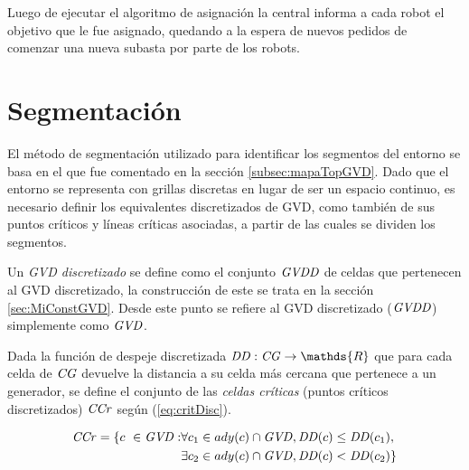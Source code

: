 
Luego de ejecutar el algoritmo de asignación la central informa a cada robot el
objetivo que le fue asignado, quedando a la espera de nuevos pedidos de
comenzar una nueva subasta por parte de los robots. 

\section{Segmentación}\label{subsec:mapaTopGVDGrid}

El método de segmentación utilizado para identificar los segmentos del entorno
se basa en el que fue comentado en la sección \ref{subsec:mapaTopGVD}. Dado que
el entorno se representa con grillas discretas en lugar de ser un espacio
continuo, es necesario definir los equivalentes discretizados de GVD, como
también de sus puntos críticos y líneas críticas asociadas, a partir de las cuales se
dividen los segmentos.

Un \emph{GVD discretizado} se define como el conjunto $\mathit{GVDD}$ de celdas que
pertenecen al GVD discretizado, la construcción de este se trata en la sección
\ref{sec:MiConstGVD}. Desde este punto se refiere al GVD discretizado ($\mathit{GVDD}$)
simplemente como $\mathit{GVD}$.


Dada la función de despeje discretizada $\mli{DD} : \mli{CG} \rightarrow
\mathds{R}$ que para cada celda de $\mathit{CG}$ devuelve la distancia a su
celda más cercana que pertenece a un generador, se define el conjunto de las
\emph{celdas críticas} (puntos críticos discretizados) $\mathit{CCr}$ según
(\ref{eq:critDisc}). 

\begin{equation}
\begin{split}
  \mli{CCr} = \{c\ \in \mli{GVD} : & \forall c_1 \in ady(c) \cap \mli{GVD}, \mli{DD}(c) \leq \mli{DD}(c_1),\\
                                    & \exists c_2 \in ady(c) \cap \mli{GVD}, \mli{DD}(c) < \mli{DD}(c_2) \} %
\end{split}
\label{eq:critDisc}
\end{equation}

